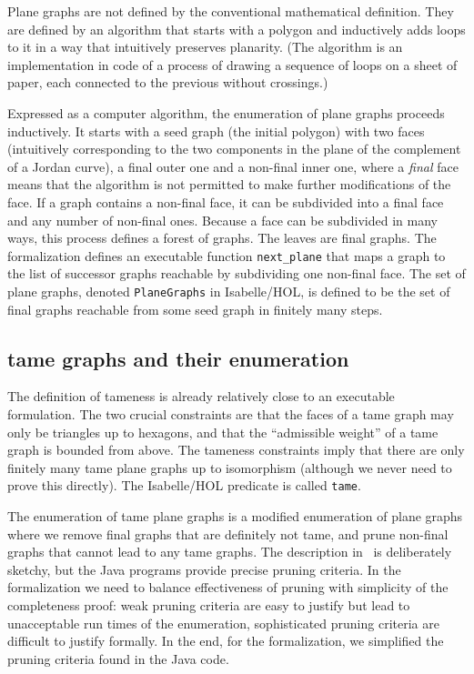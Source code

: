 Plane graphs are not defined by the conventional mathematical
definition. They are defined by an algorithm that starts with a
polygon and inductively adds loops to it in a way that intuitively
preserves planarity.  (The algorithm is an implementation in code of a
process of drawing a sequence of loops on a sheet of paper, each
connected to the previous without crossings.)

Expressed as a computer algorithm, the enumeration of plane graphs
proceeds inductively. It starts with a seed graph (the initial
polygon) with two faces (intuitively corresponding to the two
components in the plane of the complement of a Jordan curve), a final
outer one and a non-final inner one, where a {\it final} face means
that the algorithm is not permitted to make further modifications of
the face.  If a graph contains a non-final face, it can be subdivided
into a final face and any number of non-final ones.  Because a face
can be subdivided in many ways, this process defines a forest of
graphs. The leaves are final graphs.  The formalization defines an
executable function \verb!next_plane!  that maps a graph to the list
of successor graphs reachable by subdividing one non-final face.  The
set of plane graphs, denoted \verb!PlaneGraphs! in Isabelle/HOL, is
defined to be the set of final graphs reachable from some seed graph in
finitely many steps.


\subsection{tame graphs and their enumeration}

The definition of tameness is already relatively close to an
executable formulation. The two crucial constraints are that the faces
of a tame graph may only be triangles up to hexagons, and that the
``admissible weight'' of a tame graph is bounded from above. The
tameness constraints imply that there are only finitely many tame
plane graphs up to isomorphism (although we never need to prove this
directly).  The Isabelle/HOL predicate is called \verb!tame!.

The enumeration of tame plane graphs is a modified enumeration of plane
graphs where we remove final graphs that are definitely not tame, and prune
non-final graphs that cannot lead to any tame graphs.  The description
in~\cite{Hales-Annals} is deliberately sketchy, but the Java programs provide
precise pruning criteria. In the formalization we need to balance
effectiveness of pruning with simplicity of the completeness proof: weak
pruning criteria are easy to justify but lead to unacceptable run times of
the enumeration, sophisticated pruning criteria are difficult to justify
formally. In the end, for the formalization, we simplified the pruning criteria
found in the Java code.

